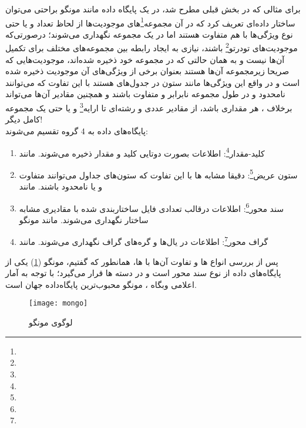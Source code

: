 برای مثالی که در بخش قبلی مطرح شد، در یک پایگاه داده  مانند مونگو براحتی می‌توان ساختار داده‌ای تعریف کرد که در آن مجموعه\footnote{}‌های موجودیت‌ها از لحاظ تعداد و یا حتی نوع ویژگی‌ها با هم متفاوت هستند اما در یک مجموعه نگهداری می‌شوند؛ درصورتی‌که موجودیت‌های تودرتو\footnote{} باشند، نیازی به ایجاد رابطه بین مجموعه‌های مختلف برای تکمیل آن‌ها نیست و به همان حالتی که در مجموعه خود ذخیره شده‌اند، موجودیت‌هایی که صریحا زیرمجموعه آن‌ها هستند بعنوان برخی از ویژگی‌های آن موجودیت ذخیره شده است و در واقع این ویژگی‌ها مانند ستون در جدول‌های  هستند با این تفاوت که می‌توانند نامحدود و در طول مجموعه نابرابر و متفاوت باشند و همچنین مقادیر آن‌ها می‌تواند برخلاف ، هر مقداری باشد، از مقادیر عددی و رشته‌ای تا ارایه\footnote{} و یا حتی یک مجموعه کامل دیگر!\\

پایگاه‌های داده  به 4 گروه تقسیم می‌شوند:
\begin{enumerate}
	\item کلید-مقدار\footnote{}: اطلاعات بصورت دوتایی کلید و مقدار ذخیره می‌شوند. مانند 
	\item ستون عریض\footnote{}: دقیقا مشابه ها با این تفاوت که ستون‌های جداول می‌توانند متفاوت و یا نامحدود باشند. مانند 
	\item سند محور\footnote{}: اطلاعات درقالب تعدادی فایل ساختاربندی شده با مقادیری مشابه ساختار  نگهداری می‌شوند. مانند مونگو
	\item گراف محور\footnote{}: اطلاعات در یال‌ها و گره‌های گراف نگهداری می‌شوند. مانند 
\end{enumerate}

پس از بررسی انواع ها و تفاوت آن‌ها با ها، همانطور که گفتیم، مونگو (\cref{fig:mongo}) یکی از پایگاه‌های داده از نوع سند محور است و در دسته ها قرار می‌گیرد؛ با توجه به آمار اعلامی وبگاه ، مونگو محبوب‌ترین پایگاه‌داده  جهان است.\\

\begin{figure}[H]
	\centering
	\texttt{[image: mongo]}
	\caption{لوگوی مونگو}
	\label{fig:mongo}
\end{figure}

